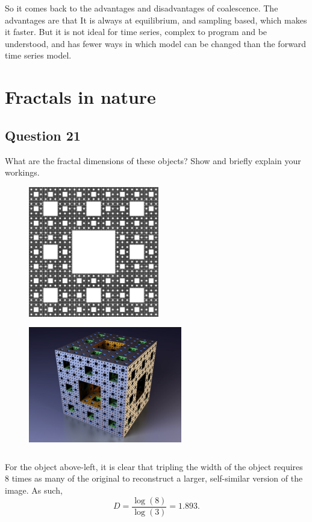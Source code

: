 \documentclass[12pt]{article}
\begin{document}
So it comes back to the advantages and disadvantages of coalescence. The advantages are that It is always at equilibrium, and sampling based, which makes it faster. But it is not ideal for time series, complex to program and be understood, and has fewer ways in which model can be changed than the forward time series model.

\newpage
\section{Fractals in nature}
\subsection{Question 21}
What are the fractal dimensions of these objects?  Show and briefly explain your workings.

\begin{figure}[htbp]
\centering
\begin{minipage}[t]{0.48\textwidth}
\centering
\includegraphics[width=5.7cm,height=5.7cm]{./1.png}
\end{minipage}
\begin{minipage}[t]{0.48\textwidth}
\centering
\includegraphics[width=6.7cm,height=5.7cm]{./2.jpg}
\end{minipage}
\end{figure}
For the object above-left, it is clear that tripling the width of the object requires 8 times as many of the original to reconstruct a larger, self-similar version of the image. As such, $$D = \frac{\log(8)}{\log(3)} = 1.893.$$
\end{document}

